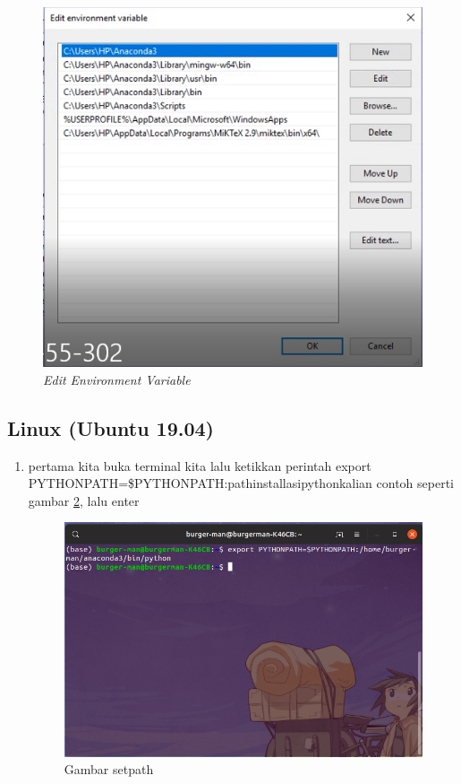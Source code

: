 \begin{enumerate}
\begin{figure}[H]
    \includegraphics[scale=0.7]{figures/ok}
    \caption{\textit{Edit Environment Variable}}
    \label{Environment5}
\end{figure}
\end{enumerate}

\subsection{Linux (Ubuntu 19.04)}
\begin{enumerate}

\item pertama kita buka terminal kita lalu ketikkan perintah export PYTHONPATH=\$PYTHONPATH:pathinstallasipythonkalian contoh seperti gambar \ref{setpath}, lalu enter
\begin{figure}[H]
\centering
\includegraphics[width=1\textwidth]{figures/setpath.png}
\caption{Gambar setpath}
\label{setpath}
\end{figure}

\end{enumerate}

